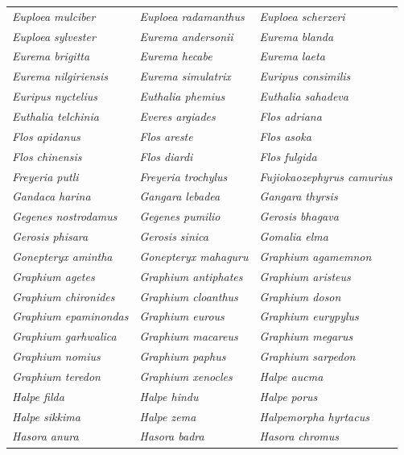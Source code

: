 \documentclass[runningheads]{llncs}
\begin{document}
\begin{longtable}{lll}
\textit{Euploea mulciber} & \textit{Euploea radamanthus} & \textit{Euploea scherzeri} \\
\textit{Euploea sylvester} & \textit{Eurema andersonii} & \textit{Eurema blanda} \\
\textit{Eurema brigitta} & \textit{Eurema hecabe} & \textit{Eurema laeta} \\
\textit{Eurema nilgiriensis} & \textit{Eurema simulatrix} & \textit{Euripus consimilis} \\
\textit{Euripus nyctelius} & \textit{Euthalia phemius} & \textit{Euthalia sahadeva} \\
\textit{Euthalia telchinia} & \textit{Everes argiades} & \textit{Flos adriana} \\
\textit{Flos apidanus} & \textit{Flos areste} & \textit{Flos asoka} \\
\textit{Flos chinensis} & \textit{Flos diardi} & \textit{Flos fulgida} \\
\textit{Freyeria putli} & \textit{Freyeria trochylus} & \textit{Fujiokaozephyrus camurius} \\
\textit{Gandaca harina} & \textit{Gangara lebadea} & \textit{Gangara thyrsis} \\
\textit{Gegenes nostrodamus} & \textit{Gegenes pumilio} & \textit{Gerosis bhagava} \\
\textit{Gerosis phisara} & \textit{Gerosis sinica} & \textit{Gomalia elma} \\
\textit{Gonepteryx amintha} & \textit{Gonepteryx mahaguru} & \textit{Graphium agamemnon} \\
\textit{Graphium agetes} & \textit{Graphium antiphates} & \textit{Graphium aristeus} \\
\textit{Graphium chironides} & \textit{Graphium cloanthus} & \textit{Graphium doson} \\
\textit{Graphium epaminondas} & \textit{Graphium eurous} & \textit{Graphium eurypylus} \\
\textit{Graphium garhwalica} & \textit{Graphium macareus} & \textit{Graphium megarus} \\
\textit{Graphium nomius} & \textit{Graphium paphus} & \textit{Graphium sarpedon} \\
\textit{Graphium teredon} & \textit{Graphium xenocles} & \textit{Halpe aucma} \\
\textit{Halpe filda} & \textit{Halpe hindu} & \textit{Halpe porus} \\
\textit{Halpe sikkima} & \textit{Halpe zema} & \textit{Halpemorpha hyrtacus} \\
\textit{Hasora anura} & \textit{Hasora badra} & \textit{Hasora chromus} \\

\end{longtable}
\end{document}
